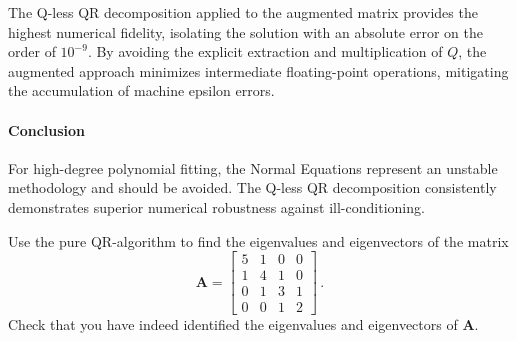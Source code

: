 \begin{solution}
	The Q-less QR decomposition applied to the augmented matrix provides the
	highest numerical fidelity, isolating the solution with an absolute error on the
	order of $10^{-9}$. By avoiding the explicit extraction and multiplication of
	$Q$, the augmented approach minimizes intermediate floating-point operations,
	mitigating the accumulation of machine epsilon errors.

	\paragraph{Conclusion}
	For high-degree polynomial fitting, the Normal Equations represent an
	unstable methodology and should be avoided. The Q-less QR decomposition
	consistently demonstrates superior numerical robustness against
	ill-conditioning.

\end{solution}

\begin{exercise}

	Use the pure QR-algorithm to find the eigenvalues and eigenvectors of the
	matrix
	\[
		\mathbf{A}=
		\begin{bmatrix}
			5 & 1 & 0 & 0 \\
			1 & 4 & 1 & 0 \\
			0 & 1 & 3 & 1 \\
			0 & 0 & 1 & 2
		\end{bmatrix}\,.
	\]
	Check that you have indeed identified the eigenvalues and eigenvectors of
	$\mathbf{A}$.

\end{exercise}

